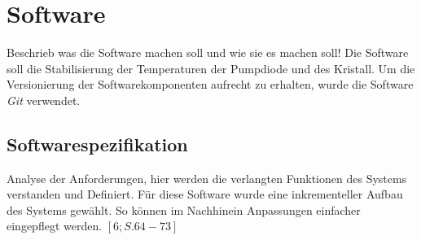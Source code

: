 \section{Software}
Beschrieb was die Software machen soll und wie sie es machen soll!
Die Software soll die Stabilisierung der Temperaturen der Pumpdiode und des Kristall. 
Um die Versionierung der Softwarekomponenten aufrecht zu erhalten, wurde die Software \textit{Git} verwendet.

\subsection{Softwarespezifikation}
Analyse der Anforderungen, hier werden die verlangten Funktionen des Systems verstanden und Definiert. Für diese Software wurde eine inkrementeller Aufbau des Systems gewählt. So können im Nachhinein Anpassungen einfacher eingepflegt werden. $[6; S. 64-73]$


% 


